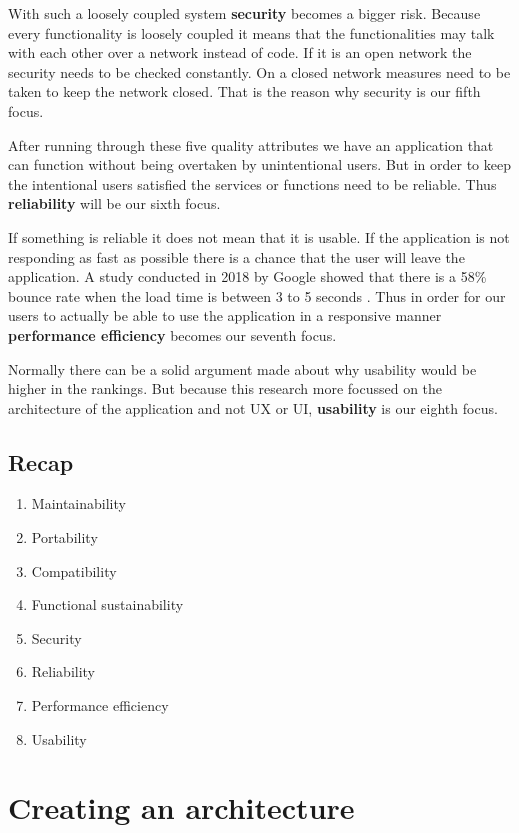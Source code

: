 With such a loosely coupled system \textbf{security} becomes a bigger risk. Because every functionality is loosely coupled it means that the functionalities may talk with each other over a network instead of code. If it is an open network the security needs to be checked constantly. On a closed network measures need to be taken to keep the network closed. That is the reason why security is our fifth focus.

After running through these five quality attributes we have an application that can function without being overtaken by unintentional users. But in order to keep the intentional users satisfied the services or functions need to be reliable. Thus \textbf{reliability} will be our sixth focus.

If something is reliable it does not mean that it is usable. If the application is not responding as fast as possible there is a chance that the user will leave the application. A study conducted in 2018 by Google showed that there is a 58\% bounce rate when the load time is between 3 to 5 seconds \cite{bounceRateDifference}. Thus in order for our users to actually be able to use the application in a responsive manner \textbf{performance efficiency} becomes our seventh focus.

Normally there can be a solid argument made about why usability would be higher in the rankings. But because this research more focussed on the architecture of the application and not UX or UI, \textbf{usability} is our eighth focus.

\subsection{Recap}
\label{sec:IsoRecap}

\begin{enumerate}
        \item Maintainability
        \item Portability
        \item Compatibility
        \item Functional sustainability
        \item Security
        \item Reliability
        \item Performance efficiency
        \item Usability
\end{enumerate}

\section{Creating an architecture}

